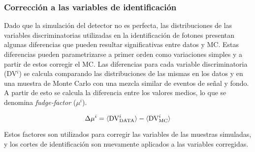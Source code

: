 


\subsubsection{Corrección a las variables de identificación}


Dado que la simulación del detector no es perfecta, las distribuciones de las variables
discriminatorias utilizadas en la identificación
de fotones presentan algunas diferencias que pueden resultar significativas entre datos y MC.
Estas diferencias pueden parametrizarse a primer orden como variaciones simples
y a partir de estos corregir el MC.
Las diferencias para cada variable discriminatoria (DV$^i$) se calcula
comparando las distribuciones de las mismas en los datos y en una muestra de
Monte Carlo con una mezcla similar de eventos de señal y fondo.
A partir de esto se calcula la diferencia
entre los valores medios, lo que se denomina \emph{fudge-factor} ($\mu^i$)\cite{ATLAS-CONF-2012-123}.

\begin{equation}
  \Delta \mu^i = \langle \mathrm{DV}^i_\text{DATA} \rangle - \langle \mathrm{DV}^i_\mathrm{MC} \rangle
\end{equation}

Estos factores son utilizados para corregir las variables de las
muestras simuladas, y los cortes de identificación son nuevamente
aplicados a las variables corregidas.



